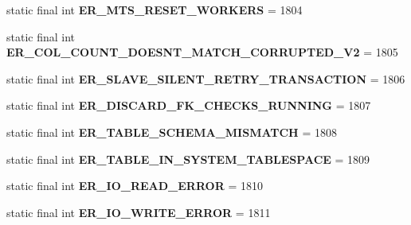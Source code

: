 \begin{DoxyCompactItemize}
static final int {\bfseries E\+R\+\_\+\+M\+T\+S\+\_\+\+R\+E\+S\+E\+T\+\_\+\+W\+O\+R\+K\+E\+RS} = 1804
\item 
\mbox{\label{classcom_1_1mysql_1_1jdbc_1_1_mysql_error_numbers_ad0ea8c9a0e9793ac4daf096402f85ac8}} 
static final int {\bfseries E\+R\+\_\+\+C\+O\+L\+\_\+\+C\+O\+U\+N\+T\+\_\+\+D\+O\+E\+S\+N\+T\+\_\+\+M\+A\+T\+C\+H\+\_\+\+C\+O\+R\+R\+U\+P\+T\+E\+D\+\_\+\+V2} = 1805
\item 
\mbox{\label{classcom_1_1mysql_1_1jdbc_1_1_mysql_error_numbers_a8bfbffa7b5ebef5e5801da56c0c68758}} 
static final int {\bfseries E\+R\+\_\+\+S\+L\+A\+V\+E\+\_\+\+S\+I\+L\+E\+N\+T\+\_\+\+R\+E\+T\+R\+Y\+\_\+\+T\+R\+A\+N\+S\+A\+C\+T\+I\+ON} = 1806
\item 
\mbox{\label{classcom_1_1mysql_1_1jdbc_1_1_mysql_error_numbers_ab071d84b9fb69d101c9b02f9c5f030fd}} 
static final int {\bfseries E\+R\+\_\+\+D\+I\+S\+C\+A\+R\+D\+\_\+\+F\+K\+\_\+\+C\+H\+E\+C\+K\+S\+\_\+\+R\+U\+N\+N\+I\+NG} = 1807
\item 
\mbox{\label{classcom_1_1mysql_1_1jdbc_1_1_mysql_error_numbers_a868ebb127a30b9f753eadd5417131418}} 
static final int {\bfseries E\+R\+\_\+\+T\+A\+B\+L\+E\+\_\+\+S\+C\+H\+E\+M\+A\+\_\+\+M\+I\+S\+M\+A\+T\+CH} = 1808
\item 
\mbox{\label{classcom_1_1mysql_1_1jdbc_1_1_mysql_error_numbers_a81c7ab8eeaf3c89714dc44ea0992d170}} 
static final int {\bfseries E\+R\+\_\+\+T\+A\+B\+L\+E\+\_\+\+I\+N\+\_\+\+S\+Y\+S\+T\+E\+M\+\_\+\+T\+A\+B\+L\+E\+S\+P\+A\+CE} = 1809
\item 
\mbox{\label{classcom_1_1mysql_1_1jdbc_1_1_mysql_error_numbers_ad60b4e6fc12fc5ca03c478c89a8edc25}} 
static final int {\bfseries E\+R\+\_\+\+I\+O\+\_\+\+R\+E\+A\+D\+\_\+\+E\+R\+R\+OR} = 1810
\item 
\mbox{\label{classcom_1_1mysql_1_1jdbc_1_1_mysql_error_numbers_a0578d01979d76ea8ddd55f63e40b9569}} 
static final int {\bfseries E\+R\+\_\+\+I\+O\+\_\+\+W\+R\+I\+T\+E\+\_\+\+E\+R\+R\+OR} = 1811

\end{DoxyCompactItemize}
